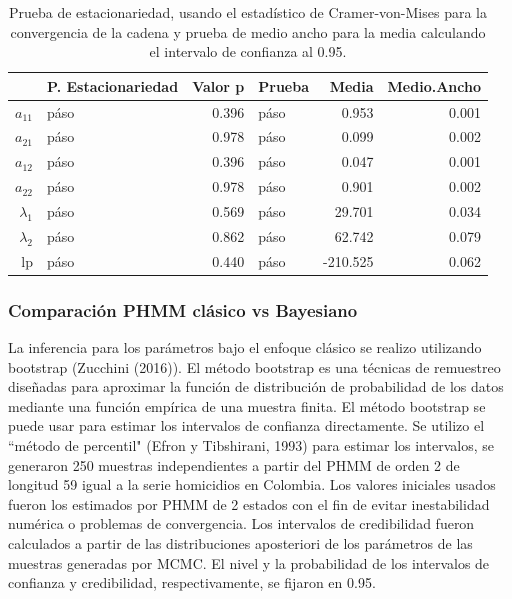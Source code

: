 \documentclass[a4paper]{article}\usepackage[]{graphicx}\usepackage[]{color}
\begin{document}
\begin{table}[ht]
\centering
\begin{tabular}{rlrlrr}
  \hline
 & P. Estacionariedad & Valor p & Prueba & Media & Medio.Ancho \\ 
  \hline
$a_{11}$ & páso & 0.396 & páso & 0.953 & 0.001 \\ 
  $a_{21}$ & páso & 0.978 & páso & 0.099 & 0.002 \\ 
  $a_{12}$ & páso & 0.396 & páso & 0.047 & 0.001 \\ 
  $a_{22}$ & páso & 0.978 & páso & 0.901 & 0.002 \\ 
  $\lambda_1$ & páso & 0.569 & páso & 29.701 & 0.034 \\ 
  $\lambda_2$ & páso & 0.862 & páso & 62.742 & 0.079 \\ 
  lp & páso & 0.440 & páso & -210.525 & 0.062 \\ 
   \hline
\end{tabular}
\caption{Prueba de estacionariedad, usando el estadístico de Cramer-von-Mises para la convergencia de la cadena y prueba de medio ancho para la media calculando el intervalo de confianza al 0.95.} 
\end{table}


\clearpage

\subsubsection{Comparación PHMM clásico vs Bayesiano}

La inferencia para los parámetros bajo el enfoque clásico se realizo utilizando bootstrap (Zucchini (2016)). El método bootstrap es una técnicas de remuestreo diseñadas para aproximar la función de distribución de probabilidad de los datos mediante una función empírica de una muestra finita. El método bootstrap se puede usar para estimar los intervalos de confianza directamente. Se utilizo el ``método de percentil" (Efron y Tibshirani, 1993) para estimar los intervalos, se generaron 250 muestras independientes a partir del PHMM de orden 2 de longitud 59 igual a la serie homicidios en Colombia. Los valores iniciales usados fueron los estimados por PHMM de 2 estados con el fin de evitar inestabilidad numérica o problemas de convergencia. Los intervalos de credibilidad fueron calculados a partir de las distribuciones aposteriori de los parámetros de las muestras generadas por MCMC. El nivel y la probabilidad de los intervalos de confianza y credibilidad, respectivamente, se fijaron en 0.95.
\end{document}
